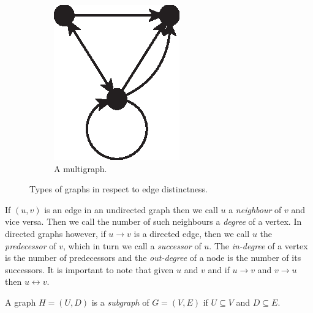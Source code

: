 \begin{figure}[H]
\begin{subfigure}[b]{0.25\textwidth}
            \includegraphics[width=\textwidth]{chapters/02_problem_definition/graph_multi}
            \caption{A multigraph.}
            \label{fig:graphs_multi}
          \end{subfigure}
        \caption{Types of graphs in respect to edge distinctness.}
        \label{fig:graphs_types}
      \end{figure}

      If $(u, v)$ is an edge in an undirected graph then we call $u$ a \emph{neighbour} of $v$ and vice versa. Then we call the number of such neighbours a \emph{degree} of a vertex. In directed graphs however, if $u \rightarrow v$ is a directed edge, then we call $u$ the \emph{predecessor} of $v$, which in turn we call a \emph{successor} of $u$. The \emph{in-degree} of a vertex is the number of predecessors and the \emph{out-degree} of a node is the number of its successors. It is important to note that given $u$ and $v$ and if $u \rightarrow v$ and $v \rightarrow u$ then $u \leftrightarrow v$.

      A graph $H = (U, D)$ is a \emph{subgraph} of $G = (V, E)$ if $U \subseteq V$ and $D \subseteq E$.

